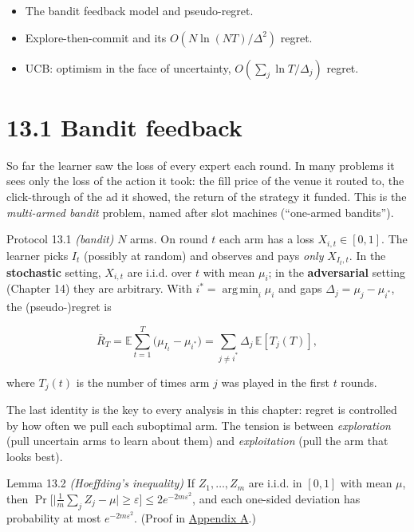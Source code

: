 \documentclass[11pt,a4paper,openany]{book}
\newcommand{\E}{\mathbb{E}}
\newcommand{\eps}{\varepsilon}
\DeclareMathOperator*{\argmin}{arg\,min}
\newcommand{\abs}[1]{\lvert #1\rvert}
\begin{document}
\begin{goals}
\begin{itemize}
\item The bandit feedback model and pseudo-regret.
\item Explore-then-commit and its $O(N\ln(NT)/\Delta^2)$ regret.
\item UCB: optimism in the face of uncertainty, $O(\sum_j\ln T/\Delta_j)$ regret.
\end{itemize}
\end{goals}

\section*{13.1 Bandit feedback}\label{ch13-setting}

So far the learner saw the loss of every expert each round. In many problems it sees only the loss of the action it took: the fill price of the venue it routed to, the click-through of the ad it showed, the return of the strategy it funded. This is the \emph{multi-armed bandit} problem, named after slot machines (``one-armed bandits'').

\begin{bdef}{Protocol 13.1 \emph{(bandit)}}
$N$ arms. On round $t$ each arm has a loss $X_{i,t}\in[0,1]$. The learner picks $I_t$ (possibly at random) and observes and pays \emph{only} $X_{I_t,t}$. In the \textbf{stochastic} setting, $X_{i,t}$ are i.i.d. over $t$ with mean $\mu_i$; in the \textbf{adversarial} setting (Chapter 14) they are arbitrary. With $i^*=\argmin_i\mu_i$ and gaps $\Delta_j=\mu_j-\mu_{i^*}$, the (pseudo-)regret is

\[\bar R_T=\E\sum_{t=1}^T\big(\mu_{I_t}-\mu_{i^*}\big)=\sum_{j\neq i^*}\Delta_j\,\E[T_j(T)],\]

where $T_j(t)$ is the number of times arm $j$ was played in the first $t$ rounds.
\end{bdef}

The last identity is the key to every analysis in this chapter: regret is controlled by how often we pull each suboptimal arm. The tension is between \emph{exploration} (pull uncertain arms to learn about them) and \emph{exploitation} (pull the arm that looks best).

\begin{bthm}{Lemma 13.2 \emph{(Hoeffding's inequality)}}
If $Z_1,\dots,Z_m$ are i.i.d. in $[0,1]$ with mean $\mu$, then $\Pr\big[\abs{\tfrac1m\sum_jZ_j-\mu}\ge\eps\big]\le2e^{-2m\eps^2}$, and each one-sided deviation has probability at most $e^{-2m\eps^2}$. (Proof in \hyperref[appA]{Appendix A}.)
\end{bthm}
\end{document}
